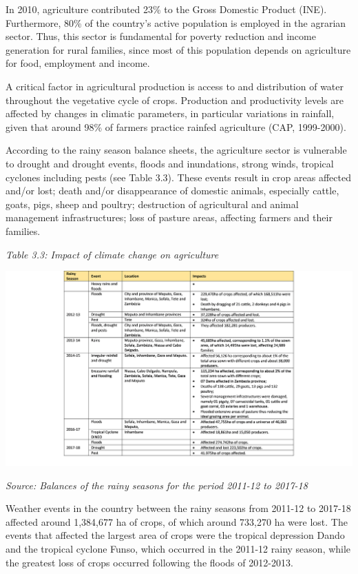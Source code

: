 \documentclass[
]{book}
\begin{document}
In 2010, agriculture contributed 23\% to the Gross Domestic Product (INE). Furthermore, 80\% of the country's active population is employed in the agrarian sector. Thus, this sector is fundamental for poverty reduction and income generation for rural families, since most of this population depends on agriculture for food, employment and income.

A critical factor in agricultural production is access to and distribution of water throughout the vegetative cycle of crops. Production and productivity levels are affected by changes in climatic parameters, in particular variations in rainfall, given that around 98\% of farmers practice rainfed agriculture (CAP, 1999-2000).

According to the rainy season balance sheets, the agriculture sector is vulnerable to drought and drought events, floods and inundations, strong winds, tropical cyclones including pests (see Table 3.3). These events result in crop areas affected and/or lost; death and/or disappearance of domestic animals, especially cattle, goats, pigs, sheep and poultry; destruction of agricultural and animal management infrastructures; loss of pasture areas, affecting farmers and their families.

\emph{Table 3.3: Impact of climate change on agriculture}

\includegraphics{Figure28.png}

\emph{Source: Balances of the rainy seasons for the period 2011-12 to 2017-18}

Weather events in the country between the rainy seasons from 2011-12 to 2017-18 affected around 1,384,677 ha of crops, of which around 733,270 ha were lost. The events that affected the largest area of crops were the tropical depression Dando and the tropical cyclone Funso, which occurred in the 2011-12 rainy season, while the greatest loss of crops occurred following the floods of 2012-2013.
\end{document}
